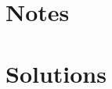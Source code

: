 \documentclass{report}
\begin{document}
\tableofcontents
\part{Notes}



\part{Solutions}


\nocite{*}


\end{document}
